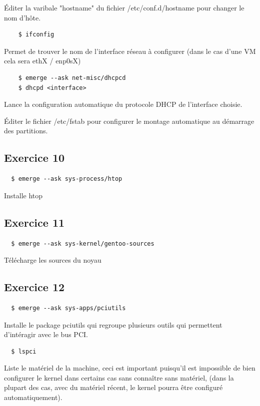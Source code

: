 \documentclass{report}
\begin{document}
Éditer la varibale "hostname" du fichier /etc/conf.d/hostname pour changer le nom d'hôte.

\begin{tcolorbox}
  \begin{verbatim}
    $ ifconfig
  \end{verbatim}
\end{tcolorbox}

Permet de trouver le nom de l'interface réseau à configurer (dans le cas d'une VM cela sera ethX / enp0sX)

\begin{tcolorbox}
  \begin{verbatim}
    $ emerge --ask net-misc/dhcpcd
    $ dhcpd <interface>
  \end{verbatim}
\end{tcolorbox}

Lance la configuration automatique du protocole DHCP de l'interface choisie.


Éditer le fichier /etc/fstab pour configurer le montage automatique au démarrage des partitions.

\newpage
\subsection{Exercice 10}
\begin{tcolorbox}
  \begin{verbatim}
  $ emerge --ask sys-process/htop
  \end{verbatim}
\end{tcolorbox}
Installe htop

\subsection{Exercice 11}
\begin{tcolorbox}
  \begin{verbatim}
  $ emerge --ask sys-kernel/gentoo-sources
  \end{verbatim}
\end{tcolorbox}
Télécharge les sources du noyau

\subsection{Exercice 12}
\begin{tcolorbox}
  \begin{verbatim}
  $ emerge --ask sys-apps/pciutils
  \end{verbatim}
\end{tcolorbox}
Installe le package pciutils qui regroupe plusieurs outils qui permettent d'intéragir avec le bus PCI.
\begin{tcolorbox}
  \begin{verbatim}
  $ lspci
  \end{verbatim}
\end{tcolorbox}
Liste le matériel de la machine, ceci est important puisqu'il est impossible de bien configurer le kernel dans certains cas sans connaître
sans matériel, (dans la plupart des cas, avec du matériel récent, le kernel pourra être configuré automatiquement).
\end{document}
